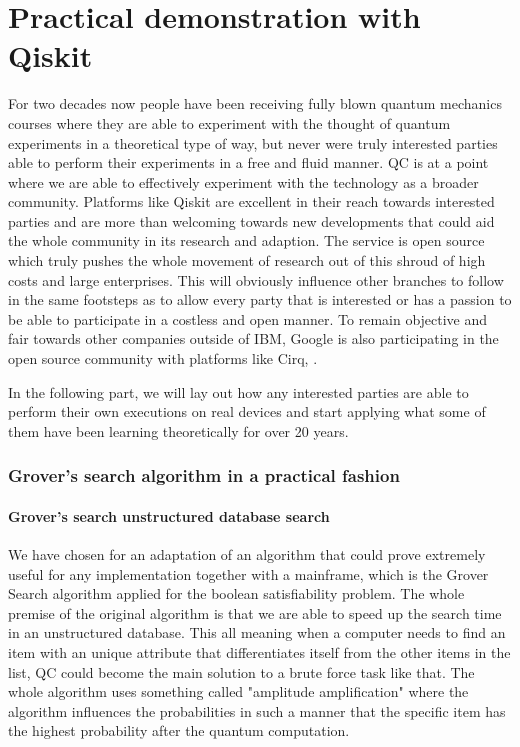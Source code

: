 
\chapter{Practical demonstration with Qiskit}
\label{ch:practical}

For two decades now people have been receiving fully blown quantum mechanics courses where they are able to experiment with the thought of quantum experiments in a theoretical type of way, but never were truly interested parties able to perform their experiments in a free and fluid manner. QC is at a point where we are able to effectively experiment with the technology as a broader community. Platforms like Qiskit are excellent in their reach towards interested parties and are more than welcoming towards new developments that could aid the whole community in its research and adaption. The service is open source which truly pushes the whole movement of research out of this shroud of high costs and large enterprises. This will obviously influence other branches to follow in the same footsteps as to allow every party that is interested or has a passion to be able to participate in a costless and open manner. To remain objective and fair towards other companies outside of IBM, Google is also participating in the open source community with platforms like Cirq, \textcite{Cirq}. 

In the following part, we will lay out how any interested parties are able to perform their own executions on real devices and start applying what some of them have been learning theoretically for over 20 years.

\subsection{Grover's search algorithm in a practical fashion}
\subsubsection{Grover's search unstructured database search}

We have chosen for an adaptation of an algorithm that could prove extremely useful for any implementation together with a mainframe, which is the Grover Search algorithm applied for the boolean satisfiability problem. The whole premise of the original algorithm is that we are able to speed up the search time in an unstructured database. This all meaning when a computer needs to find an item with an unique attribute that differentiates itself from the other items in the list, QC could become the main solution to a brute force task like that. The whole algorithm uses something called "amplitude amplification" where the algorithm influences the probabilities in such a manner that the specific item has the highest probability after the quantum computation. \autocite{Grover1996}

